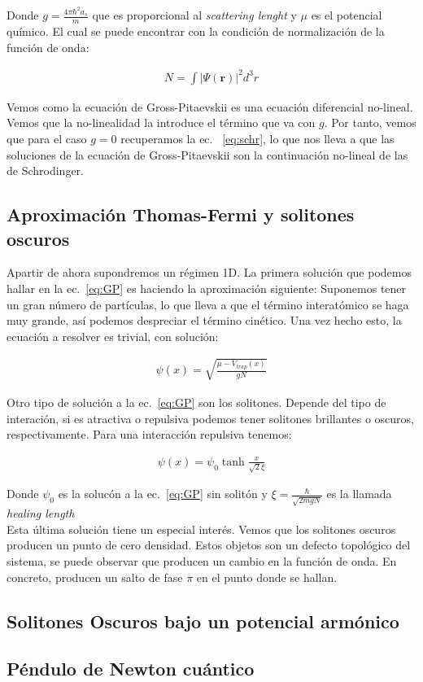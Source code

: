Donde $g=\frac{4\pi \hbar^2 a_s}{m}$ que es proporcional al \textit{scattering lenght} y  $\mu$ es el potencial qu\'imico. El cual se puede encontrar con la condici\'on de normalizaci\'on de la funci\'on de onda:

\begin{align}
N=\int |\Psi(\mathbf{r})|^2 d^3r
\label{eq:norma}
\end{align}

Vemos como la ecuaci\'on de Gross-Pitaevskii es una ecuaci\'on diferencial no-lineal. Vemos que la no-linealidad la introduce el t\'ermino que va con $g$. Por tanto, vemos que para el caso $g=0$ recuperamos la ec. ~\eqref{eq:schr}, lo que nos lleva a que las soluciones de la ecuaci\'on de Gross-Pitaevskii son la continuaci\'on no-lineal de las de Schrodinger.

\subsection{Aproximaci\'on Thomas-Fermi y solitones oscuros}
Apartir de ahora supondremos un r\'egimen 1D. La primera soluci\'on que podemos hallar en la ec.~\eqref{eq:GP}  es haciendo la aproximaci\'on siguiente:
Suponemos tener un gran n\'umero de part\'iculas, lo que lleva a que el t\'ermino interat\'omico se haga muy grande, as\'i podemos despreciar el t\'ermino cin\'etico. Una vez hecho esto, la ecuaci\'on a resolver es trivial, con soluci\'on:
 
 \begin{align}
 \psi(x)=\sqrt{\frac{\mu-V_{trap}(x)}{gN}}
 \label{eq:TF}
 \end{align}
 
Otro tipo de soluci\'on a la ec.~\eqref{eq:GP}  son los solitones. Depende del tipo de interaci\'on, si es atractiva o repulsiva podemos tener solitones brillantes o oscuros, respectivamente. Para una interacci\'on repulsiva tenemos:

 \begin{align}
\psi(x)=\psi_0 \tanh{\frac{x}{\sqrt{2}\xi}}
\label{eq:soliton}
\end{align}

Donde $\psi_0$ es la soluc\'on a la ec.~\eqref{eq:GP} sin solit\'on y $\xi=\frac{\hbar}{\sqrt{2mgN}}$ es la llamada \textit{healing length}
\\

Esta \'ultima soluci\'on tiene un especial inter\'es. Vemos que los solitones oscuros producen un punto de cero densidad. Estos objetos son un defecto topol\'ogico del sistema, se puede observar que producen un cambio en la funci\'on de onda. En concreto, producen un salto de fase $\pi$ en el punto donde se hallan.
\\

\subsection{Solitones Oscuros bajo un potencial arm\'onico}
\subsection{P\'endulo de Newton cu\'antico}
